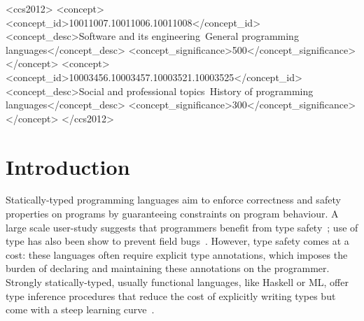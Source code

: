 \documentclass[sigplan,10pt,review,anonymous]{acmart} %
\theoremstyle{plain}
\theoremstyle{remark}
\theoremstyle{definition}
\begin{document}
\begin{CCSXML}
	<ccs2012>
	<concept>
	<concept_id>10011007.10011006.10011008</concept_id>
	<concept_desc>Software and its engineering~General programming languages</concept_desc>
	<concept_significance>500</concept_significance>
	</concept>
	<concept>
	<concept_id>10003456.10003457.10003521.10003525</concept_id>
	<concept_desc>Social and professional topics~History of programming languages</concept_desc>
	<concept_significance>300</concept_significance>
	</concept>
	</ccs2012>
\end{CCSXML}




\maketitle

\section{Introduction}

Statically-typed programming languages aim to enforce correctness and safety  properties
on programs by guaranteeing constraints on program behaviour.
A large scale user-study
suggests that programmers
benefit from type safety~\citep{hanenberg14}; use of type has also been
show to prevent field bugs~\citep{gao17}.
However, type safety comes at a cost: these languages often require explicit type annotations,
which imposes the burden of declaring and maintaining these annotations on the programmer.
Strongly statically-typed, usually functional languages, like Haskell or ML,
offer type inference procedures that reduce
the cost of explicitly writing types but come with
a steep learning curve~\citep{wadler98}.
\end{document}
